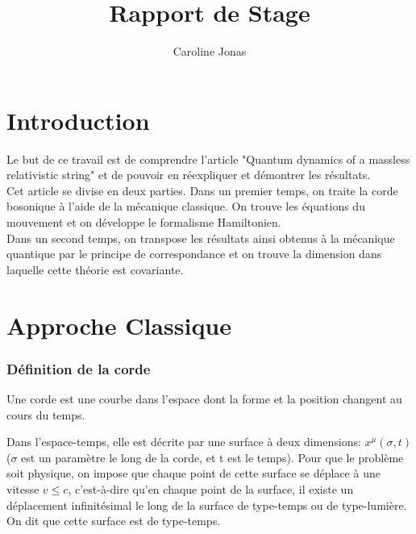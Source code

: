 \documentclass[a4paper,12pt]{article}
\title{Rapport de Stage}
\author{Caroline Jonas}
\begin{document}
\maketitle

\part*{Introduction}
Le but de ce travail est de comprendre l'article "Quantum dynamics of a massless relativistic string" et de pouvoir en réexpliquer et démontrer les résultats.\\
Cet article se divise en deux parties. Dans un premier temps, on traite la corde bosonique à l'aide de la mécanique classique. On trouve les équations du mouvement et on développe le formalisme Hamiltonien.\\
Dans un second temps, on transpose les résultats ainsi obtenus à la mécanique quantique par le principe de correspondance et on trouve la dimension dans laquelle cette théorie est covariante. 
\part*{Approche Classique}
\section{Définition de la corde}
Une corde est une courbe dans l'espace dont la forme et la position changent au cours du temps.

Dans l'espace-temps, elle est décrite par une surface à deux dimensions:
$x^{\mu}(\sigma,t)$ ($\sigma$ est un paramètre le long de la corde, et t est le temps).
Pour que le problème soit physique, on impose que chaque point de cette surface se déplace à une vitesse $v\leq c$, c'est-à-dire qu'en chaque point de la surface, il existe un déplacement infinitésimal le long de la surface de type-temps ou de type-lumière. On dit que cette surface est de type-temps.
\end{document}

